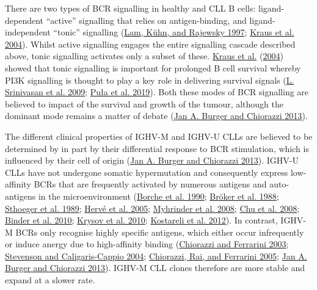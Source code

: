 \documentclass[11pt, a4paper, twosided]{book}
\begin{document}
There are two types of BCR signalling in healthy and CLL B cells: ligand-dependent ``active'' signalling that relies on antigen-binding, and ligand-independent ``tonic'' signalling (\protect\hyperlink{ref-Lam1997}{Lam, Kühn, and Rajewsky 1997}; \protect\hyperlink{ref-Kraus2004}{Kraus et al. 2004}). Whilst active signalling engages the entire signalling cascade described above, tonic signalling activates only a subset of these. \protect\hyperlink{ref-Kraus2004}{Kraus et al.} (\protect\hyperlink{ref-Kraus2004}{2004}) showed that tonic signalling is important for prolonged B cell survival whereby PI3K signalling is thought to play a key role in delivering survival signals (\protect\hyperlink{ref-Srinivasan2009}{L. Srinivasan et al. 2009}; \protect\hyperlink{ref-Pula2019}{Puła et al. 2019}). Both these modes of BCR signalling are believed to impact of the survival and growth of the tumour, although the dominant mode remains a matter of debate (\protect\hyperlink{ref-Burger2013}{Jan A. Burger and Chiorazzi 2013}).

The different clinical properties of IGHV-M and IGHV-U CLLs are believed to be determined by in part by their differential response to BCR stimulation, which is influenced by their cell of origin (\protect\hyperlink{ref-Burger2013}{Jan A. Burger and Chiorazzi 2013}). IGHV-U CLLs have not undergone somatic hypermutation and consequently express low-affinity BCRs that are frequently activated by numerous antigens and auto-antigens in the microenvironment (\protect\hyperlink{ref-Borche1990}{Borche et al. 1990}; \protect\hyperlink{ref-Broker1988}{Bröker et al. 1988}; \protect\hyperlink{ref-Sthoeger1989}{Sthoeger et al. 1989}; \protect\hyperlink{ref-Herve2005}{Hervé et al. 2005}; \protect\hyperlink{ref-Lanemo2008}{Myhrinder et al. 2008}; \protect\hyperlink{ref-Chu2008}{Chu et al. 2008}; \protect\hyperlink{ref-Binder2010}{Binder et al. 2010}; \protect\hyperlink{ref-Krysov2010}{Krysov et al. 2010}; \protect\hyperlink{ref-Kostareli2012}{Kostareli et al. 2012}). In contrast, IGHV-M BCRs only recognise highly specific antigens, which either occur infrequently or induce anergy due to high-affinity binding (\protect\hyperlink{ref-Chiorazzi2003}{Chiorazzi and Ferrarini 2003}; \protect\hyperlink{ref-Stevenson2004}{Stevenson and Caligaris-Cappio 2004}; \protect\hyperlink{ref-Chiorazzi2005}{Chiorazzi, Rai, and Ferrarini 2005}; \protect\hyperlink{ref-Burger2013}{Jan A. Burger and Chiorazzi 2013}). IGHV-M CLL clones therefore are more stable and expand at a slower rate.
\end{document}
